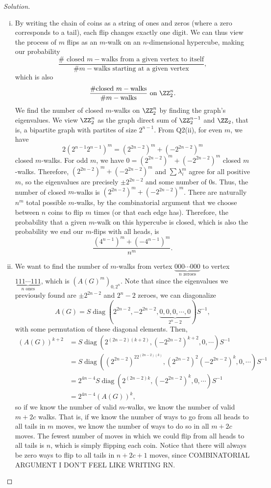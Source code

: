 \documentclass[11pt]{scrartcl}
\begin{document}
\begin{proof}[Solution]
\begin{enumerate}[(i)]
    \item By writing the chain of coins as a string of ones and zeros (where a zero corresponds to a tail), each flip changes exactly one digit. We can thus view the process of $m$ flips as an $m$-walk on an $n$-dimensional hypercube, making our probability \[\frac{\#\text{ closed }m-\text{walks from a given vertex to itself}}{\#m-\text{walks starting at a given vertex}},\]which is also \[\frac{\#\text{closed }m-\text{walks}}{\#m-\text{walks}}\text{ on }\ZZ_2^n.\] We find the number of closed $m$-walks on $\ZZ_2^n$ by finding the graph's eigenvalues. We view $\ZZ_2^n$ as the graph direct sum of $\ZZ_2^{n-1}$ and $\ZZ_2$, that is, a bipartite graph with partites of size $2^{n-1}$. From Q2(ii), for even $m$, we have \[2(2^{n-1}2^{n-1})^m=(2^{2n-2})^m+(-2^{2n-2})^m\] closed $m$-walks. For odd $m$, we have $0=(2^{2n-2})^m+(-2^{2n-2})^m$ closed $m$-walks. Therefore, $(2^{2n-2})^m+(-2^{2n-2})^m$ and $\sum\lambda_i^m$ agree for all positive $m$, so the eigenvalues are precisely $\pm2^{2n-2}$ and some number of $0$s. Thus, the number of closed $m$-walks is $(2^{2n-2})^m+(-2^{2n-2})^m$. There are naturally $n^m$ total possible $m$-walks,  by the combinatorial argument that we choose between $n$ coins to flip $m$ times (or that each edge has). Therefore, the probability that a given $m$-walk on this hypercube is closed, which is also the probability we end our $m$-flips with all heads, is \[\boxed{\frac{(4^{n-1})^m+(-4^{n-1})^m}{n^m}}.\]
    \item We want to find the number of $m$-walks from vertex $\underbrace{000\cdots000}_{n\text{ zeroes}}$ to vertex $\underbrace{111\cdots111}_{n\text{ ones}}$, which is $(A(G)^m)_{0,2^n}$. Note that since the eigenvalues we previously found are $\pm2^{2n-2}$ and $2^{n}-2$ zeroes, we can diagonalize \[A(G)=S\mathop{\mathrm{diag}}(2^{2n-2},-2^{2n-2},\underbrace{0,0,0,\cdots,0}_{2^n-2})S^{-1},\] with some permutation of these diagonal elements. Then, 
    \begin{align*}
        (A(G))^{k+2}&=S\mathop{\mathrm{diag}}(2^{(2n-2)(k+2)},(-2^{2n-2})^{k+2},0,\cdots)S^{-1}\\
        &=S\mathop{\mathrm{diag}}((2^{2n-2})^22^{(2n-2)(k)},(2^{2n-2})^2(-2^{2n-2})^{k},0,\cdots)S^{-1}\\
        &=2^{4n-4}S\mathop{\mathrm{diag}}(2^{(2n-2)k},(-2^{2n-2})^{k},0,\cdots)S^{-1}\\
        &=2^{4n-4}(A(G))^k,
    \end{align*}
    so if we know the number of valid $m$-walks, we know the number of valid $m+2c$ walks. That is, if we know the number of ways to go from all heads to all tails in $m$ moves, we know the number of ways to do so in all $m+2c$ moves. The fewest number of moves in which we could flip from all heads to all tails is $n$, which is simply flipping each coin. Notice that there will always be zero ways to flip to all tails in $n+2c+1$ moves, since COMBINATORIAL ARGUMENT I DON'T FEEL LIKE WRITING RN.


\end{enumerate}
\end{proof}
\end{document}
